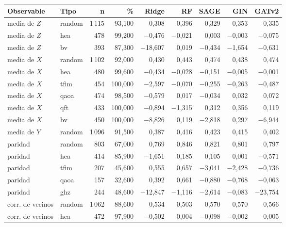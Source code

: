 \begin{table}[htbp]
    \centering
    {\footnotesize
    \begin{tabular}{@{}llrrrrrrr@{}}
        \toprule
        \textbf{Observable} & \textbf{Tipo} & \textbf{n} & \textbf{\%} & \textbf{Ridge} & \textbf{RF} & \textbf{SAGE} & \textbf{GIN} & \textbf{GATv2} \\
        \midrule
        media de $Z$ & random & 1\,115 & 93,100 & 0,308 & 0,396 & 0,329 & 0,353 & 0,335 \\
        media de $Z$ & hea & 478 & 99,200 & $-$0,476 & $-$0,021 & 0,003 & $-$0,003 & $-$0,075 \\
        media de $Z$ & bv & 393 & 87,300 & $-$18,607 & 0,019 & $-$0,434 & $-$1,654 & $-$0,631 \\
        media de $X$ & random & 1\,102 & 92,000 & 0,430 & 0,443 & 0,474 & 0,438 & 0,474 \\
        media de $X$ & hea & 480 & 99,600 & $-$0,434 & $-$0,028 & $-$0,151 & $-$0,005 & $-$0,001 \\
        media de $X$ & tfim & 454 & 100,000 & $-$2,597 & $-$0,070 & $-$0,255 & $-$0,263 & $-$0,487 \\
        media de $X$ & qaoa & 474 & 98,500 & $-$0,579 & 0,017 & $-$0,034 & 0,032 & 0,072 \\
        media de $X$ & qft & 433 & 100,000 & $-$0,894 & $-$1,315 & 0,312 & 0,356 & 0,119 \\
        media de $X$ & bv & 450 & 100,000 & $-$8,826 & 0,119 & $-$2,818 & 0,297 & $-$6,944 \\
        media de $Y$ & random & 1\,096 & 91,500 & 0,387 & 0,416 & 0,423 & 0,415 & 0,402 \\
        paridad & random & 803 & 67,000 & 0,769 & 0,846 & 0,821 & 0,801 & 0,797 \\
        paridad & hea & 414 & 85,900 & $-$1,651 & 0,185 & 0,105 & 0,001 & $-$0,571 \\
        paridad & tfim & 207 & 45,600 & 0,555 & 0,657 & $-$3,041 & $-$2,428 & $-$0,736 \\
        paridad & qaoa & 157 & 32,600 & 0,392 & 0,661 & $-$0,880 & $-$0,768 & $-$0,063 \\
        paridad & ghz & 244 & 48,600 & $-$12,847 & $-$1,116 & $-$2,614 & $-$0,083 & $-$23,754 \\
        corr. de vecinos & random & 1\,062 & 88,600 & 0,534 & 0,503 & 0,570 & 0,570 & 0,566 \\
        corr. de vecinos & hea & 472 & 97,900 & $-$0,502 & 0,004 & $-$0,098 & $-$0,002 & 0,005 \\

\end{tabular}}
\end{table}
